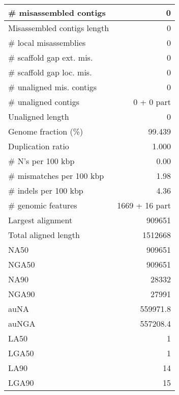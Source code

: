 \documentclass[12pt,a4paper]{article}
\begin{document}
\begin{table}[ht]
\begin{center}
\begin{tabular}{|l*{1}{|r}|}
\# misassembled contigs & 0 \\ \hline
Misassembled contigs length & 0 \\ \hline
\# local misassemblies & 0 \\ \hline
\# scaffold gap ext. mis. & 0 \\ \hline
\# scaffold gap loc. mis. & 0 \\ \hline
\# unaligned mis. contigs & 0 \\ \hline
\# unaligned contigs & 0 + 0 part \\ \hline
Unaligned length & 0 \\ \hline
Genome fraction (\%) & 99.439 \\ \hline
Duplication ratio & 1.000 \\ \hline
\# N's per 100 kbp & 0.00 \\ \hline
\# mismatches per 100 kbp & 1.98 \\ \hline
\# indels per 100 kbp & 4.36 \\ \hline
\# genomic features & 1669 + 16 part \\ \hline
Largest alignment & 909651 \\ \hline
Total aligned length & 1512668 \\ \hline
NA50 & 909651 \\ \hline
NGA50 & 909651 \\ \hline
NA90 & 28332 \\ \hline
NGA90 & 27991 \\ \hline
auNA & 559971.8 \\ \hline
auNGA & 557208.4 \\ \hline
LA50 & 1 \\ \hline
LGA50 & 1 \\ \hline
LA90 & 14 \\ \hline
LGA90 & 15 \\ \hline
\end{tabular}
\end{center}
\end{table}
\end{document}
